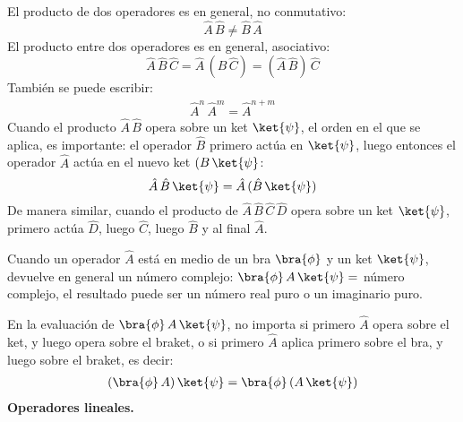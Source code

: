 El producto de dos operadores es en general, no conmutativo:
\begin{equation}
\hat{A} \, \hat{B} \neq \hat{B} \, \hat{A}
\label{eq:ecuacion_02_53}
\end{equation}
El producto entre dos operadores es en general, asociativo:
\begin{equation}
\hat{A} \, \hat{B} \, \hat{C} =  \hat{A} \, (\hat{B} \, \hat{C}) = (\hat{A} \, \hat{B}) \, \hat{C} 
\label{eq:ecuacion_02_54}
\end{equation}
También se puede escribir:
\begin{align*}
\hat{A}^{n} \, \hat{A}^{m} = \hat{A}^{n + m}
\end{align*}
Cuando el producto $\hat{A} \, \hat{B}$ opera sobre un ket $\ket{\psi}$, el orden en el que se aplica, es importante: el operador $\hat{B}$ primero actúa en $\ket{\psi}$, luego entonces el operador $\hat{A}$ actúa en el nuevo ket $(B \, \ket{\psi}$:
\begin{equation}
\hat{A} \, \hat{B} \, \ket{\psi} = \hat{A} \, (\hat{B} \, \ket{\psi})
\label{eq:ecuacion_02_55}
\end{equation}
De manera similar, cuando el producto de $\hat{A} \, \hat{B} \, \hat{C} \, \hat{D}$ opera sobre un ket $\ket{\psi}$, primero actúa $\hat{D}$, luego $\hat{C}$, luego $\hat{B}$ y al final $\hat{A}$.
\par
Cuando un operador $\hat{A}$ está en medio de un bra $\bra{\phi}$ y un ket $\ket{\psi}$, devuelve en general un número complejo: $\bra{\phi} \, A \, \ket{\psi} =$ número complejo, el resultado puede ser un número real puro o un imaginario puro.
\par
En la evaluación de $\bra{\phi} \, A \, \ket{\psi}$, no importa si primero $\hat{A}$ opera sobre el ket, y luego opera sobre el braket, o si primero $\hat{A}$ aplica primero sobre el bra, y luego sobre el braket, es decir:
\begin{align*}
(\bra{\phi} \, A) \, \ket{\psi} = \bra{\phi} \, (A \, \ket{\psi})
\end{align*}
\textbf{Operadores lineales.}

